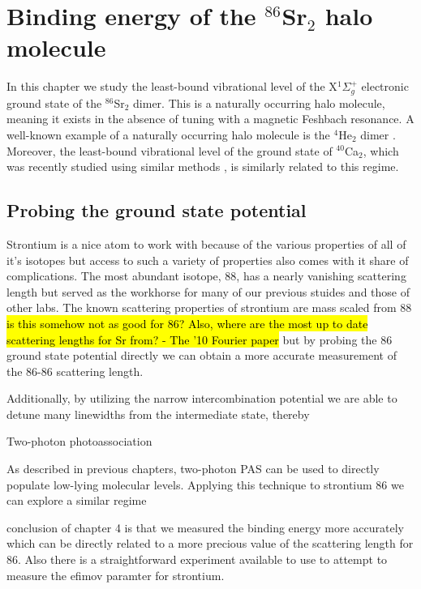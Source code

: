 \chapter{Binding energy of the $^{86}$Sr$_2$ halo molecule}
\label{ch:chap4}

In this chapter we study the least-bound vibrational level of the X$^1\Sigma_g^+$ electronic ground state of the $^{86}$Sr$_2$ dimer.
This is a naturally occurring halo molecule, meaning it exists in the absence of tuning with a magnetic Feshbach resonance. 
A well-known example of a naturally occurring halo molecule is the $^4$He$_2$ dimer \cite{lmk93,sto94,kgj06}.
Moreover, the least-bound vibrational level of the ground state of $^{40}$Ca$_2$, which was recently studied using similar methods \cite{Pachomow2017a}, is similarly related to this regime.

\section{Probing the ground state potential}
\label{sec:lowE_intro}

Strontium is a nice atom to work with because of the various properties of all of it's isotopes but access to such a variety of properties also comes with it share of complications. The most abundant isotope, 88, has a nearly vanishing scattering length but served as the workhorse for many of our previous stuides and those of other labs. The known scattering properties of strontium are mass scaled from 88 \hl{is this somehow not as good for 86? Also, where are the most up to date scattering lengths for Sr from? - The '10 Fourier paper} but by probing the 86 ground state potential directly we can obtain a more accurate measurement of the 86-86 scattering length.

Additionally, by utilizing the narrow intercombination potential we are able to detune many linewidths from the intermediate state, thereby 

Two-photon photoassociation 

As described in previous chapters, two-photon PAS can be used to directly populate low-lying molecular levels. Applying this technique to strontium 86 we can explore a similar regime

conclusion of chapter 4 is that we measured the binding energy more accurately which can be directly related to a more precious value of the scattering length for 86. Also there is a straightforward experiment available to use to attempt to measure the efimov paramter for strontium.

